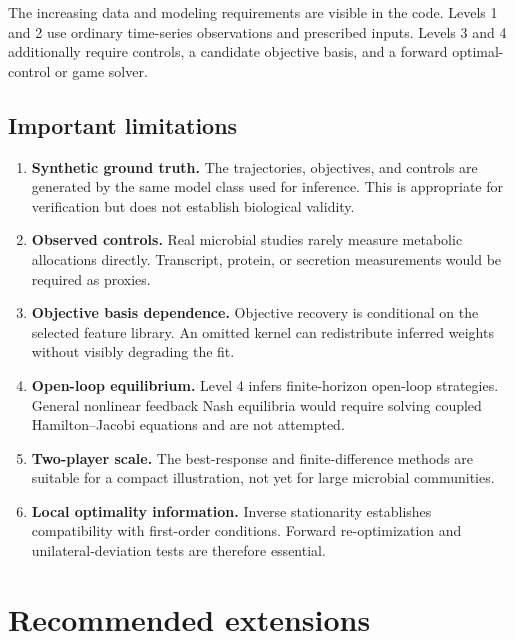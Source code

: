 \documentclass[11pt,a4paper]{article}
\begin{document}
The increasing data and modeling requirements are visible in the code. Levels
1 and 2 use ordinary time-series observations and prescribed inputs. Levels 3
and 4 additionally require controls, a candidate objective basis, and a
forward optimal-control or game solver.

\subsection{Important limitations}

\begin{enumerate}
  \item \textbf{Synthetic ground truth.} The trajectories, objectives, and
        controls are generated by the same model class used for inference.
        This is appropriate for verification but does not establish biological
        validity.
  \item \textbf{Observed controls.} Real microbial studies rarely measure
        metabolic allocations directly. Transcript, protein, or secretion
        measurements would be required as proxies.
  \item \textbf{Objective basis dependence.} Objective recovery is conditional
        on the selected feature library. An omitted kernel can redistribute
        inferred weights without visibly degrading the fit.
  \item \textbf{Open-loop equilibrium.} Level 4 infers finite-horizon open-loop
        strategies. General nonlinear feedback Nash equilibria would require
        solving coupled Hamilton--Jacobi equations and are not attempted.
  \item \textbf{Two-player scale.} The best-response and finite-difference
        methods are suitable for a compact illustration, not yet for large
        microbial communities.
  \item \textbf{Local optimality information.} Inverse stationarity establishes
        compatibility with first-order conditions. Forward re-optimization and
        unilateral-deviation tests are therefore essential.
\end{enumerate}

\section{Recommended extensions}
\end{document}
